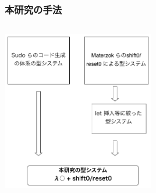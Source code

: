\documentclass[dvipdfmx,cjk,xcolor=dvipsnames,envcountsect,notheorems,12pt,handout]{beamer} \usepackage{pgfpages} \pgfpagesuselayout{4 on 1}[a4paper,landscape,border shrink=5mm]
\theoremstyle{definition}
\begin{document}
\begin{frame}[fragile]
  \frametitle{本研究の手法}
  \begin{columns}

    \begin{column}{1.\textwidth}%
      \center
      \includegraphics[clip,height=7cm]{./img/type_system_me.png}
    \end{column}



  \end{columns}
\end{frame}

\end{document}
